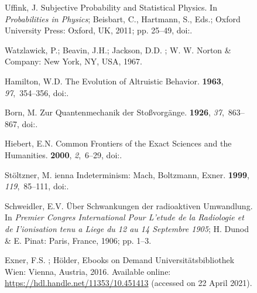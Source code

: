 \documentclass[entropy,article,accept,oneauthor,pdftex]{Definitions/mdpi}
\begin{document}
\begin{figure}[H]
\begin{thebibliography}{999}
Uffink, J.
\newblock Subjective Probability and Statistical Physics. In {\em Probabilities
  in Physics}; Beisbart, C., Hartmann, S., Eds.; Oxford University Press: Oxford, UK, 2011; pp. 25--49, doi:{\href{https://doi.org/10.1093/acprof:oso/9780199577439.003.0002}{}}.

Watzlawick, P.; Beavin, J.H.; Jackson, D.D.
; W. W. Norton \& Company: New York, NY, USA,  1967.

Hamilton, W.D.
\newblock The Evolution of Altruistic Behavior.
 {\bf 1963}, {\em 97},~354--356, doi:{\href{https://doi.org/10.1086/497114}{}}.

Born, M.
\newblock Zur {Q}uantenmechanik der {S}to{\ss}vorg{\"{a}}nge.
 {\bf 1926}, {\em 37},~863--867, doi:{\href{https://doi.org/10.1007/BF01397477}{}}.

Hiebert, E.N.
\newblock Common Frontiers of the Exact Sciences and the Humanities.
 {\bf 2000}, {\em 2},~6--29, doi:{\href{https://doi.org/10.1007/s000160050034}{}}.

St\"oltzner, M.
ienna Indeterminism: {M}ach, {B}oltzmann, {E}xner.
 {\bf 1999}, {\em 119},~85--111, doi:{\href{https://doi.org/10.1023/a:1005243320885}{}}.

Schweidler, E.V. {\"U}ber {S}chwankungen der radioaktiven {U}mwandlung.
\newblock In {\em Premier Congres International Pour L'etude de la Radiologie
  et de {I}'ionisation tenu a {L}iege du 12 au 14 {S}eptembre 1905}; H. Dunod
  \& E. Pinat: Paris, France, 1906; pp. 1--3.

Exner, F.S.
; H\"older, Ebooks on
  Demand Universit\"atsbibliothek Wien: Vienna, Austria, 2016.  %
Available online: \url{https://hdl.handle.net/11353/10.451413} (accessed on 22 April 2021).%


\end{thebibliography}
\end{figure}
\end{document}
